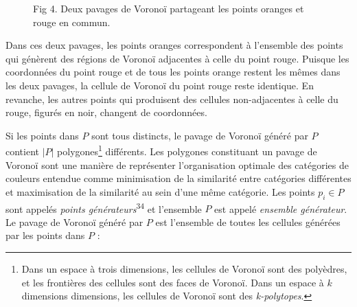 \documentclass{article}
\begin{document}
\begin{figure}[htbp]
{%
}

\caption{Fig 4. Deux pavages de Voronoï partageant les points oranges et rouge en commun.}

\end{figure}

Dans ces deux pavages, les points oranges correspondent à l'ensemble des points qui génèrent des régions de Voronoï adjacentes à celle du point rouge. Puisque les coordonnées du point rouge et de tous les points orange restent les mêmes dans les deux pavages, la cellule de Voronoï du point rouge reste identique. En revanche, les autres points qui produisent des cellules non-adjacentes à celle du rouge, figurés en noir, changent de coordonnées.
\vspace*{1cm}
\par
Si les points dans $P$ sont tous distincts, le pavage de Vorono\"{i} généré par $P$ contient $|P|$
polygones\footnote{Dans un espace à trois dimensions, les cellules de Voronoï sont des polyèdres, et les frontières des cellules
sont des faces de Voronoï. Dans un espace à $k$ dimensions dimensions, les cellules de Voronoï sont des \textit{k-polytopes}.} différents. Les polygones constituant un pavage de Vorono\"{i} sont une manière de
représenter l'organisation optimale des catégories de couleurs entendue comme minimisation
de la similarité entre catégories différentes et maximisation de la similarité au sein d'une même
catégorie. Les points $p_i \in P$ sont appelés \textit{points générateurs}\textsuperscript{34} et l'ensemble $P$ est appelé
\textit{ensemble générateur}. Le pavage de Vorono\"{i} généré par $P$ est l'ensemble de toutes les cellules
générées par les points dans $P$ :
\end{document}
